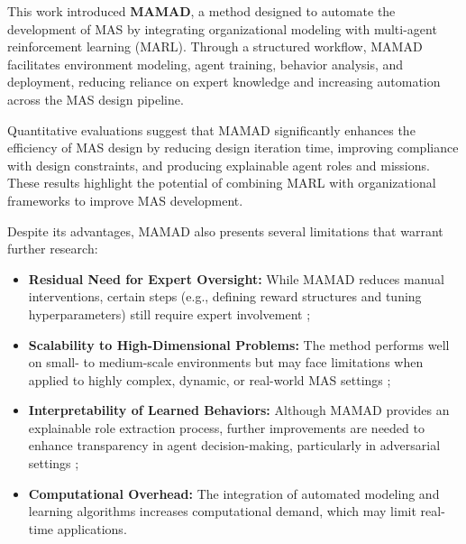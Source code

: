 \documentclass[journal]{IEEEtai}
\begin{document}
This work introduced \textbf{MAMAD}, a method designed to automate the development of MAS by integrating organizational modeling with multi-agent reinforcement learning (MARL). Through a structured workflow, MAMAD facilitates environment modeling, agent training, behavior analysis, and deployment, reducing reliance on expert knowledge and increasing automation across the MAS design pipeline. 

Quantitative evaluations suggest that MAMAD significantly enhances the efficiency of MAS design by reducing design iteration time, improving compliance with design constraints, and producing explainable agent roles and missions. These results highlight the potential of combining MARL with organizational frameworks to improve MAS development.


Despite its advantages, MAMAD also presents several limitations that warrant further research:
%
\begin{itemize}
    \item \textbf{Residual Need for Expert Oversight:} While MAMAD reduces manual interventions, certain steps (e.g., defining reward structures and tuning hyperparameters) still require expert involvement ;
    \item \textbf{Scalability to High-Dimensional Problems:} The method performs well on small- to medium-scale environments but may face limitations when applied to highly complex, dynamic, or real-world MAS settings ;
    \item \textbf{Interpretability of Learned Behaviors:} Although MAMAD provides an explainable role extraction process, further improvements are needed to enhance transparency in agent decision-making, particularly in adversarial settings ;
    \item \textbf{Computational Overhead:} The integration of automated modeling and learning algorithms increases computational demand, which may limit real-time applications.
\end{itemize}
\end{document}

